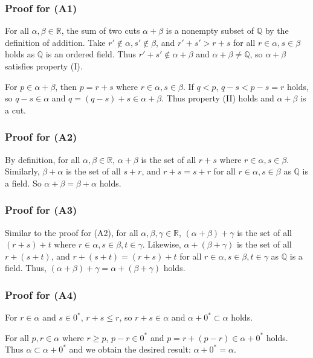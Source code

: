 \documentclass{scrartcl}
\begin{document}
\subsubsection{Proof for (A1)}
For all \(\alpha, \beta \in \mathbb{R}\), the sum of two cuts \(\alpha + \beta\) is a nonempty subset of \(\mathbb{Q}\) by the definition of addition.
Take \(r' \not \in \alpha, s' \not \in \beta\), and \(r' + s' > r + s\) for all \(r \in \alpha, s \in \beta\) holds as \(\mathbb{Q}\) is an ordered field.
Thus \(r' + s' \not \in \alpha + \beta\) and \(\alpha + \beta \not = \mathbb{Q}\), so \(\alpha + \beta\) satisfies property (I).

For \(p \in \alpha + \beta\), then \(p = r + s\) where \(r \in \alpha, s \in \beta\).
If \(q < p\), \(q - s < p - s = r\) holds, so \(q - s \in \alpha\) and \(q = (q - s) + s \in \alpha + \beta\).
Thus property (II) holds and \(\alpha + \beta\) is a cut.

\subsubsection{Proof for (A2)}
By definition, for all \(\alpha, \beta \in \mathbb{R}\), \(\alpha + \beta\) is the set of all \(r + s\) where \(r \in \alpha, s \in \beta\).
Similarly, \(\beta + \alpha\) is the set of all \(s + r\), and \(r + s = s + r\) for all \(r \in \alpha, s \in \beta\)  as \(\mathbb{Q}\) is a field.
So \(\alpha + \beta = \beta + \alpha\) holds.

\subsubsection{Proof for (A3)}
Similar to the proof for (A2), for all \(\alpha, \beta, \gamma \in \mathbb{R}\), \((\alpha + \beta) + \gamma\) is the set of all \((r + s) + t\) where \(r \in \alpha, s \in \beta, t \in \gamma\).
Likewise, \(\alpha + (\beta + \gamma)\) is the set of all \(r + (s + t)\), and \(r + (s + t) = (r + s) + t\) for all \(r \in \alpha, s \in \beta, t \in \gamma\) as \(\mathbb{Q}\) is a field.
Thus, \((\alpha + \beta) + \gamma = \alpha + (\beta + \gamma)\) holds.

\subsubsection{Proof for (A4)}
For \(r \in \alpha\) and \(s \in 0^*\), \(r + s \leq r\), so \(r + s \in \alpha\) and \(\alpha + 0^* \subset \alpha\) holds.

For all \(p, r \in \alpha\) where \(r \geq p\), \(p - r \in 0^*\) and \(p = r + (p - r) \in \alpha + 0^*\) holds.
Thus \(\alpha \subset \alpha + 0^*\) and we obtain the desired result: \(\alpha + 0^* = \alpha\).
\end{document}
